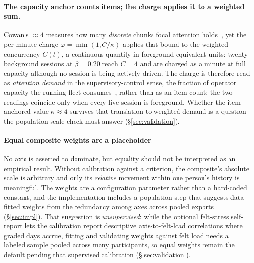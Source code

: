 \documentclass[10pt,twocolumn]{article}
\begin{document}
\paragraph{The capacity anchor counts items; the charge applies it to a
weighted sum.} Cowan's $\approx 4$ measures how many \emph{discrete} chunks
focal attention holds~\cite{cowan2001}, yet the per-minute charge
$\varphi=\min(1,C/\kappa)$ applies that bound to the weighted concurrency
$C(t)$, a continuous quantity in foreground-equivalent units: twenty
background sessions at $\beta=0.20$ reach $C=4$ and are charged as a minute
at full capacity although no session is being actively driven. The charge is
therefore read as \emph{attention demand} in the supervisory-control sense,
the fraction of operator capacity the running fleet
consumes~\cite{crandall2007}, rather than as an item count; the two readings
coincide only when every live session is foreground. Whether the
item-anchored value $\kappa\approx 4$ survives that translation to weighted
demand is a question the population scale check must answer
(\S\ref{sec:validation}).

\paragraph{Equal composite weights are a placeholder.} No axis is asserted to
dominate, but equality should not be interpreted as an empirical result. Without calibration against
a criterion, the composite's absolute scale is arbitrary and only its
\emph{relative} movement within one person's history is meaningful. The weights
are a configuration parameter rather than a hard-coded constant, and the
implementation includes a population step that suggests data-fitted weights from
the redundancy among axes across pooled exports (\S\ref{sec:impl}). That
suggestion is \emph{unsupervised}: while the optional felt-stress self-report
lets the calibration report descriptive axis-to-felt-load correlations where
graded days accrue, fitting and validating weights against felt load needs a
labeled sample pooled across many participants, so equal weights remain the
default pending that supervised calibration
(\S\ref{sec:validation}).
\end{document}
